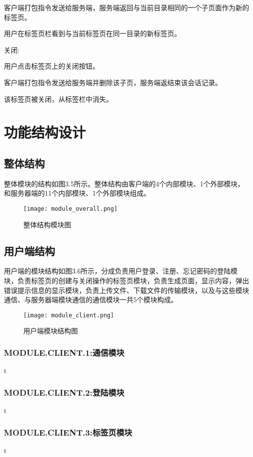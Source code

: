 客户端打包指令发送给服务端，服务端返回与当前目录相同的一个子页面作为新的标签页。

用户在标签页栏看到与当前标签页在同一目录的新标签页。

关闭:

用户点击标签页上的关闭按钮。 

客户端打包指令发送给服务端并删除该子页，服务端返结束该会话记录。

该标签页被关闭，从标签栏中消失。 

\section{功能结构设计}
\subsection{整体结构}
整体模块的结构如图3.5所示。整体结构由客户端的4个内部模块、1个外部模块，和服务器端的11个内部模块、1个外部模块组成。

\begin{figure}[!ht] 
\centering 
\texttt{[image: module\_overall.png]} 
\caption{整体结构模块图}\label{fig:noted-figure}
\end{figure}

\subsection{用户端结构}
用户端的模块结构如图3.6所示，分成负责用户登录、注册、忘记密码的登陆模块，负责标签页的创建与关闭操作的标签页模块，负责生成页面，显示内容，弹出错误提示信息的显示模块，负责上传文件、下载文件的传输模块，以及与这些模块通信、与服务器端模块通信的通信模块一共5个模块构成。
\begin{figure}[!h]  
\centering 
\texttt{[image: module\_client.png]} 
\caption{用户端模块结构图}\label{fig:noted-figure}
\end{figure}

\subsubsection{MODULE.CLIENT.1:通信模块}
t

\subsubsection{MODULE.CLIENT.2:登陆模块}
t

\subsubsection{MODULE.CLIENT.3:标签页模块}
t

